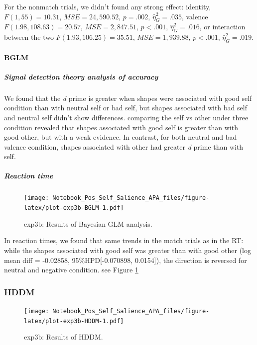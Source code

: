 \documentclass[
  english,
  man]{apa6}
\let\oldparagraph\paragraph
\renewcommand{\paragraph}[1]{\oldparagraph{#1}\mbox{}}
\let\oldsubparagraph\subparagraph
\renewcommand{\subparagraph}[1]{\oldsubparagraph{#1}\mbox{}}
\begin{document}
For the nonmatch trials, we didn't found any strong effect: identity, \(F(1, 55) = 10.31\), \(\mathit{MSE} = 24,590.52\), \(p = .002\), \(\hat{\eta}^2_G = .035\), valence \(F(1.98, 108.63) = 20.57\), \(\mathit{MSE} = 2,847.51\), \(p < .001\), \(\hat{\eta}^2_G = .016\), or interaction between the two \(F(1.93, 106.25) = 35.51\), \(\mathit{MSE} = 1,939.88\), \(p < .001\), \(\hat{\eta}^2_G = .019\).

\hypertarget{bglm-3}{%
\paragraph{BGLM}\label{bglm-3}}

\hypertarget{signal-detection-theory-analysis-of-accuracy-5}{%
\subparagraph{Signal detection theory analysis of accuracy}\label{signal-detection-theory-analysis-of-accuracy-5}}

We found that the \emph{d} prime is greater when shapes were associated with good self condition than with neutral self or bad self, but shapes associated with bad self and neutral self didn't show differences. comparing the self vs other under three condition revealed that shapes associated with good self is greater than with good other, but with a weak evidence. In contrast, for both neutral and bad valence condition, shapes associated with other had greater \emph{d} prime than with self.

\hypertarget{reaction-time-7}{%
\subparagraph{Reaction time}\label{reaction-time-7}}

\begin{figure}
\centering
\texttt{[image: Notebook\_Pos\_Self\_Salience\_APA\_files/figure-latex/plot-exp3b-BGLM-1.pdf]}
\caption{\label{fig:plot-exp3b-BGLM}exp3b: Results of Bayesian GLM analysis.}
\end{figure}

In reaction times, we found that same trends in the match trials as in the RT: while the shapes associated with good self was greater than with good other (log mean diff = -0.02858, 95\%HPD{[}-0.070898, 0.0154{]}), the direction is reversed for neutral and negative condition. see Figure \ref{fig:plot-exp3b-BGLM}

\hypertarget{hddm-6}{%
\subsubsection{HDDM}\label{hddm-6}}

\begin{figure}
\centering
\texttt{[image: Notebook\_Pos\_Self\_Salience\_APA\_files/figure-latex/plot-exp3b-HDDM-1.pdf]}
\caption{\label{fig:plot-exp3b-HDDM}exp3b: Results of HDDM.}
\end{figure}
\end{document}
